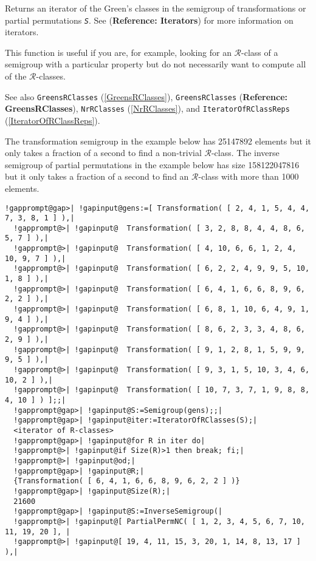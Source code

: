 \documentclass[a4paper,11pt]{report}
\begin{document}
{{{ Returns an iterator of the Green's classes in the semigroup of transformations
or partial permutations \mbox{\texttt{\mdseries\slshape S}}. See  (\textbf{Reference: Iterators}) for more information on iterators.

 This function is useful if you are, for example, looking for an $\mathcal{R}$-class of a semigroup with a particular property but do not necessarily want
to compute all of the $\mathcal{R}$-classes.

 See also \texttt{GreensRClasses} (\ref{GreensRClasses}), \texttt{GreensRClasses} (\textbf{Reference: GreensRClasses}), \texttt{NrRClasses} (\ref{NrRClasses}), and \texttt{IteratorOfRClassReps} (\ref{IteratorOfRClassReps}).

 The transformation semigroup in the example below has 25147892 elements but it
only takes a fraction of a second to find a non-trivial $\mathcal{R}$-class. The inverse semigroup of partial permutations in the example below has
size 158122047816 but it only takes a fraction of a second to find an $\mathcal{R}$-class with more than 1000 elements. 
\begin{Verbatim}[commandchars=!@|,fontsize=\small,frame=single,label=Example]
  !gapprompt@gap>| !gapinput@gens:=[ Transformation( [ 2, 4, 1, 5, 4, 4, 7, 3, 8, 1 ] ),|
  !gapprompt@>| !gapinput@  Transformation( [ 3, 2, 8, 8, 4, 4, 8, 6, 5, 7 ] ),|
  !gapprompt@>| !gapinput@  Transformation( [ 4, 10, 6, 6, 1, 2, 4, 10, 9, 7 ] ),|
  !gapprompt@>| !gapinput@  Transformation( [ 6, 2, 2, 4, 9, 9, 5, 10, 1, 8 ] ),|
  !gapprompt@>| !gapinput@  Transformation( [ 6, 4, 1, 6, 6, 8, 9, 6, 2, 2 ] ),|
  !gapprompt@>| !gapinput@  Transformation( [ 6, 8, 1, 10, 6, 4, 9, 1, 9, 4 ] ),|
  !gapprompt@>| !gapinput@  Transformation( [ 8, 6, 2, 3, 3, 4, 8, 6, 2, 9 ] ),|
  !gapprompt@>| !gapinput@  Transformation( [ 9, 1, 2, 8, 1, 5, 9, 9, 9, 5 ] ),|
  !gapprompt@>| !gapinput@  Transformation( [ 9, 3, 1, 5, 10, 3, 4, 6, 10, 2 ] ),|
  !gapprompt@>| !gapinput@  Transformation( [ 10, 7, 3, 7, 1, 9, 8, 8, 4, 10 ] ) ];;|
  !gapprompt@gap>| !gapinput@S:=Semigroup(gens);;|
  !gapprompt@gap>| !gapinput@iter:=IteratorOfRClasses(S);|
  <iterator of R-classes>
  !gapprompt@gap>| !gapinput@for R in iter do|
  !gapprompt@>| !gapinput@if Size(R)>1 then break; fi;|
  !gapprompt@>| !gapinput@od;|
  !gapprompt@gap>| !gapinput@R;|
  {Transformation( [ 6, 4, 1, 6, 6, 8, 9, 6, 2, 2 ] )}
  !gapprompt@gap>| !gapinput@Size(R);|
  21600
  !gapprompt@gap>| !gapinput@S:=InverseSemigroup(|
  !gapprompt@>| !gapinput@[ PartialPermNC( [ 1, 2, 3, 4, 5, 6, 7, 10, 11, 19, 20 ], |
  !gapprompt@>| !gapinput@[ 19, 4, 11, 15, 3, 20, 1, 14, 8, 13, 17 ] ),|

\end{Verbatim}}}}
\end{document}
